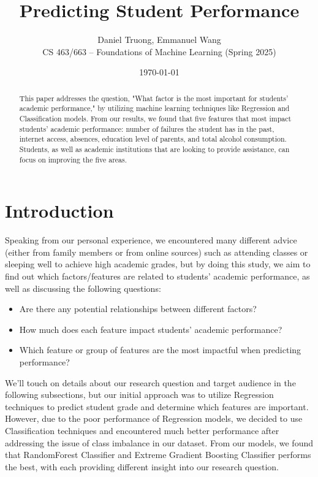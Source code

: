 \documentclass[11pt,a4paper]{article}
\title{\Large \textbf{Predicting Student Performance}}
\author{Daniel Truong, Emmanuel Wang \\ CS 463/663 – Foundations of Machine Learning (Spring 2025)}
\date{\today}
\begin{document}
\maketitle

\begin{abstract}
This paper addresses the question, "What factor is the most important for students' academic performance," by utilizing machine learning techniques like Regression and Classification models. From our results, we found that five features that most impact students' academic performance: number of failures the student has in the past, internet access, absences, education level of parents, and total alcohol consumption. Students, as well as academic institutions that are looking to provide assistance, can focus on improving the five areas.
\end{abstract}

\tableofcontents
\newpage

\section{Introduction}
Speaking from our personal experience, we encountered many different advice (either from family members or from online sources) such as attending classes or sleeping well to achieve high academic grades, but  by doing this study, we aim to find out which factors/features are related to students’ academic performance, as well as discussing the following questions:
\begin{itemize}
    \item Are there any potential relationships between different factors?
    \item How much does each feature impact students' academic performance?
    \item Which feature or group of features are the most impactful when predicting performance?
\end{itemize}
We'll touch on details about our research question and target audience in the following subsections, but our initial approach was to utilize Regression techniques to predict student grade and determine which features are important. However, due to the poor performance of Regression models, we decided to use Classification techniques and encountered much better performance after addressing the issue of class imbalance in our dataset. From our models, we found that RandomForest Classifier and Extreme Gradient Boosting Classifier performs the best, with each providing different insight into our research question.
\end{document}

